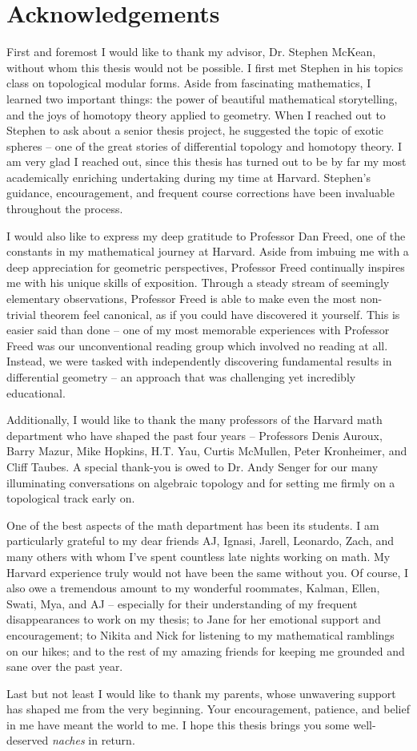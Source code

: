 \chapter*{Acknowledgements}

First and foremost I would like to thank my advisor, Dr. Stephen McKean, without whom this thesis would not be possible. I first met Stephen in his topics class on topological modular forms. Aside from fascinating mathematics, I learned two important things: the power of beautiful mathematical storytelling, and the joys of homotopy theory applied to geometry. 
When I reached out to Stephen to ask about a senior thesis project, he suggested the topic of exotic spheres -- one of the great stories of differential topology and homotopy theory. I am very glad I reached out, since this thesis has turned out to be by far my most academically enriching undertaking during my time at Harvard. Stephen's guidance, encouragement, and frequent course corrections have been invaluable throughout the process.

I would also like to express my deep gratitude to Professor Dan Freed, one of the constants in my mathematical journey at Harvard.
Aside from imbuing me with a deep appreciation for geometric perspectives, Professor Freed continually inspires me with his unique skills of exposition. Through a steady stream of seemingly elementary observations, Professor Freed is able to make even the most non-trivial theorem feel canonical, as if you could have discovered it yourself.
This is easier said than done -- one of my most memorable experiences with Professor Freed was our unconventional reading group which involved no reading at all. Instead, we were tasked with independently discovering fundamental results in differential geometry -- an approach that was challenging yet incredibly educational.

Additionally, I would like to thank the many professors of the Harvard math department who have shaped the past four years -- 
Professors Denis Auroux, Barry Mazur, Mike Hopkins, H.T. Yau, Curtis McMullen, Peter Kronheimer, and Cliff Taubes. A special thank-you is owed to Dr. Andy Senger for our many illuminating conversations on algebraic topology and for setting me firmly on a  topological track early on. 

One of the best aspects of the math department has been its students. I am particularly  grateful to my dear friends AJ, Ignasi, Jarell, Leonardo, Zach, and many others with whom I've spent countless late nights working on math. My Harvard experience truly would not have been the same without you.
Of course, I also owe a tremendous amount to my wonderful roommates, Kalman, Ellen, Swati, Mya, and AJ -- especially for their understanding of my frequent disappearances to work on my thesis; to Jane for her emotional support and encouragement; to Nikita and Nick for listening to my mathematical ramblings on our hikes; and to the rest of my amazing friends for keeping me grounded and sane over the past year. 

Last but not least I would like to thank my parents, whose unwavering support has shaped me from the very beginning. Your encouragement, patience, and belief in me have meant the world to me. I hope this thesis brings you some well-deserved \emph{naches} in return.
